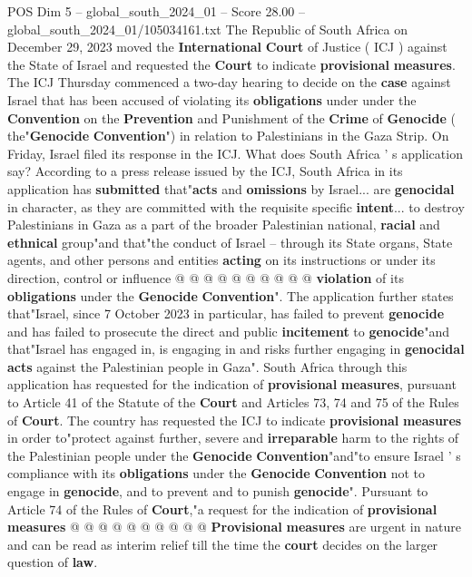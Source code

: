 \begin{textsample}{POS Dim 5 – global\_south\_2024\_01 – Score 28.00 – global\_south\_2024\_01/105034161.txt}  \label{ex:f5_pos_001}
The Republic of South Africa on December 29, 2023 moved the \textbf{International} \textbf{Court} of Justice ( ICJ ) against the State of Israel and requested the \textbf{Court} to indicate \textbf{provisional} \textbf{measures}.
The ICJ Thursday commenced a two-day hearing to decide on the \textbf{case} against Israel that has been accused of violating its \textbf{obligations} under under the \textbf{Convention} on the \textbf{Prevention} and Punishment of the \textbf{Crime} of \textbf{Genocide} ( the"\textbf{Genocide} \textbf{Convention}") in relation to Palestinians in the Gaza Strip.
On Friday, Israel filed its response in the ICJ.
What does South Africa ' s application say?
According to a press release issued by the ICJ, South Africa in its application has \textbf{submitted} that"\textbf{acts} and \textbf{omissions} by Israel... are \textbf{genocidal} in character, as they are committed with the requisite specific \textbf{intent}... to destroy Palestinians in Gaza as a part of the broader Palestinian national, \textbf{racial} and \textbf{ethnical} group"and that"the conduct of Israel -- through its State organs, State agents, and other persons and entities \textbf{acting} on its instructions or under its direction, control or influence @ @ @ @ @ @ @ @ @ @ \textbf{violation} of its \textbf{obligations} under the \textbf{Genocide} \textbf{Convention}".
The application further states that"Israel, since 7 October 2023 in particular, has failed to prevent \textbf{genocide} and has failed to prosecute the direct and public \textbf{incitement} to \textbf{genocide}"and that"Israel has engaged in, is engaging in and risks further engaging in \textbf{genocidal} \textbf{acts} against the Palestinian people in Gaza".
South Africa through this application has requested for the indication of \textbf{provisional} \textbf{measures}, pursuant to Article 41 of the Statute of the \textbf{Court} and Articles 73, 74 and 75 of the Rules of \textbf{Court}.
The country has requested the ICJ to indicate \textbf{provisional} \textbf{measures} in order to"protect against further, severe and \textbf{irreparable} harm to the rights of the Palestinian people under the \textbf{Genocide} \textbf{Convention}"and"to ensure Israel ' s compliance with its \textbf{obligations} under the \textbf{Genocide} \textbf{Convention} not to engage in \textbf{genocide}, and to prevent and to punish \textbf{genocide}".
Pursuant to Article 74 of the Rules of \textbf{Court},"a request for the indication of \textbf{provisional} \textbf{measures} @ @ @ @ @ @ @ @ @ @ \textbf{Provisional} \textbf{measures} are urgent in nature and can be read as interim relief till the time the \textbf{court} decides on the larger question of \textbf{law}.

\end{textsample}
